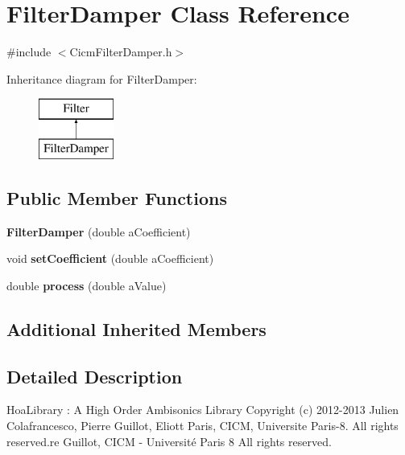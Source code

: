 \hypertarget{class_filter_damper}{\section{Filter\-Damper Class Reference}
\label{class_filter_damper}
}


{\ttfamily \#include $<$Cicm\-Filter\-Damper.\-h$>$}

Inheritance diagram for Filter\-Damper\-:\begin{figure}[H]
\begin{center}
\leavevmode
\includegraphics[height=2.000000cm]{class_filter_damper}
\end{center}
\end{figure}
\subsection*{Public Member Functions}
\begin{DoxyCompactItemize}
\item 
\hypertarget{class_filter_damper_a75d31eac4c4dbd76f219bc364813eb49}{{\bfseries Filter\-Damper} (double a\-Coefficient)}\label{class_filter_damper_a75d31eac4c4dbd76f219bc364813eb49}

\item 
\hypertarget{class_filter_damper_a922c331d030fbe87b8ce19b9c1796b89}{void {\bfseries set\-Coefficient} (double a\-Coefficient)}\label{class_filter_damper_a922c331d030fbe87b8ce19b9c1796b89}

\item 
\hypertarget{class_filter_damper_a02b1693d0ae4dfa481e46fe4b73915a2}{double {\bfseries process} (double a\-Value)}\label{class_filter_damper_a02b1693d0ae4dfa481e46fe4b73915a2}

\end{DoxyCompactItemize}
\subsection*{Additional Inherited Members}


\subsection{Detailed Description}
Hoa\-Library \-: A High Order Ambisonics Library Copyright (c) 2012-\/2013 Julien Colafrancesco, Pierre Guillot, Eliott Paris, C\-I\-C\-M, Universite Paris-\/8. All rights reserved.\-re Guillot, C\-I\-C\-M -\/ Université Paris 8 All rights reserved.

